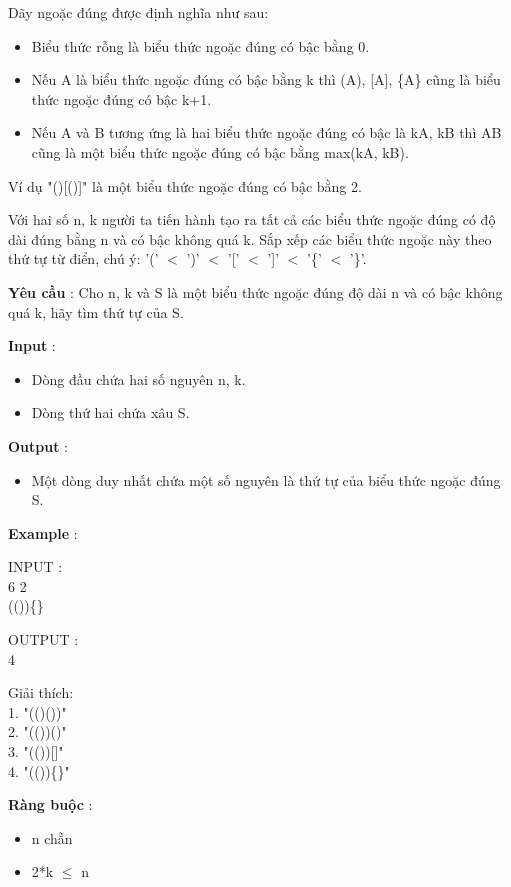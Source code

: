 



   Dãy ngoặc đúng được định nghĩa như sau:  
\begin{itemize}
	\item     Biểu thức rỗng là biểu thức ngoặc đúng có bậc bằng 0.   
	\item     Nếu A là biểu thức ngoặc đúng có bậc bằng k thì (A), [A], \{A\} cũng là biểu thức ngoặc đúng có bậc k+1.   
	\item     Nếu A và B tương ứng là hai biểu thức ngoặc đúng có bậc là kA, kB thì AB cũng là một biểu thức ngoặc đúng có bậc bằng max(kA, kB).   
\end{itemize}

   Ví dụ "()[()]" là một biểu thức ngoặc đúng có bậc bằng 2.  

   Với hai số n, k người ta tiến hành tạo ra tất cả các biểu thức ngoặc đúng có độ dài đúng bằng n và có bậc không quá k. Sắp xếp các biểu thức ngoặc này theo thứ tự từ điển, chú ý: '(' $<$ ')' $<$ '[' $<$ ']' $<$ '\{' $<$ '\}'.  

\textbf{      Yêu cầu     }   : Cho n, k và S là một biểu thức ngoặc đúng độ dài n và có bậc không quá k, hãy tìm thứ tự của S.  

\textbf{     Input    }   :  
\begin{itemize}
	\item     Dòng đầu chứa hai số nguyên n, k.   
	\item     Dòng thứ hai chứa xâu S.   
\end{itemize}

\textbf{      Output     }   :  
\begin{itemize}
	\item     Một dòng duy nhất chứa một số nguyên là thứ tự của biểu thức ngoặc đúng S.   
\end{itemize}

\textbf{      Example     }   :  

    INPUT      :   
\\   6 2   
\\   (())\{\}  

    OUTPUT      :   
\\   4  

   Giải thích:   
\\   1. "(()())"   
\\   2. "(())()"   
\\   3. "(())[]"   
\\   4. "(())\{\}"  

\textbf{      Ràng buộc     }   :  
\begin{itemize}
	\item     n chẵn   
	\item     2*k  $\le$  n   
\end{itemize}

